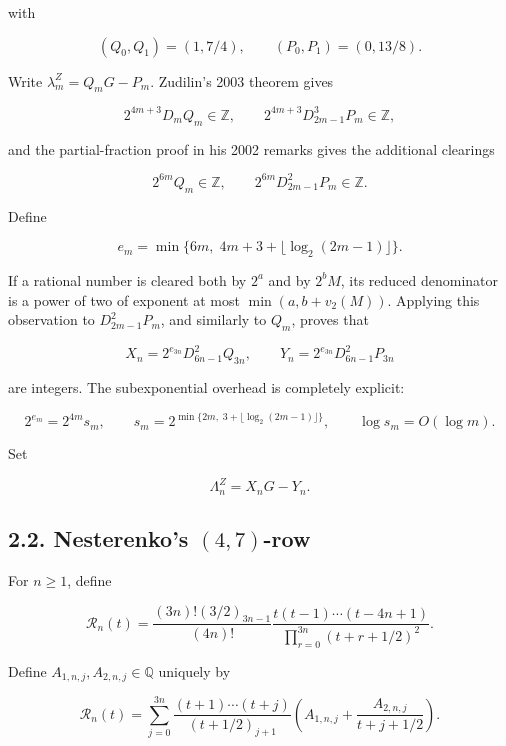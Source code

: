 \documentclass[
  11pt,
]{article}
\begin{document}
with

\[
 (Q_0,Q_1)=(1,7/4),\qquad (P_0,P_1)=(0,13/8).
                                                               \tag{2.2}
\]

Write \(\lambda_m^Z=Q_mG-P_m\). Zudilin's 2003 theorem gives

\[
 2^{4m+3}D_mQ_m\in\mathbb Z,\qquad
 2^{4m+3}D_{2m-1}^3P_m\in\mathbb Z,                  \tag{2.3}
\]

and the partial-fraction proof in his 2002 remarks gives the additional
clearings

\[
 2^{6m}Q_m\in\mathbb Z,\qquad
 2^{6m}D_{2m-1}^2P_m\in\mathbb Z.                   \tag{2.4}
\]

Define

\[
 e_m=\min\{6m,\;4m+3+\lfloor\log_2(2m-1)\rfloor\}.   \tag{2.5}
\]

If a rational number is cleared both by \(2^a\) and by \(2^bM\), its
reduced denominator is a power of two of exponent at most
\(\min(a,b+v_2(M))\). Applying this observation to \(D_{2m-1}^2P_m\),
and similarly to \(Q_m\), proves that

\[
 X_n=2^{e_{3n}}D_{6n-1}^2Q_{3n},\qquad
 Y_n=2^{e_{3n}}D_{6n-1}^2P_{3n}                    \tag{2.6}
\]

are integers. The subexponential overhead is completely explicit:

\[
 2^{e_m}=2^{4m}s_m,\qquad
 s_m=2^{\min\{2m,\;3+\lfloor\log_2(2m-1)\rfloor\}},
 \qquad \log s_m=O(\log m).                          \tag{2.7}
\]

Set

\[
 \Lambda_n^Z=X_nG-Y_n.
                                                               \tag{2.8}
\]

\hypertarget{nesterenkos-47-row}{%
\subsection{\texorpdfstring{2.2. Nesterenko's
\((4,7)\)-row}{2.2. Nesterenko's (4,7)-row}}\label{nesterenkos-47-row}}

For \(n\ge1\), define

\[
 \mathcal R_n(t)=
 \frac{(3n)!(3/2)_{3n-1}}{(4n)!}
 \frac{t(t-1)\cdots(t-4n+1)}
      {\prod_{r=0}^{3n}(t+r+1/2)^2}.                 \tag{2.9}
\]

Define \(A_{1,n,j},A_{2,n,j}\in\mathbb Q\) uniquely by

\[
 \mathcal R_n(t)=\sum_{j=0}^{3n}
 \frac{(t+1)\cdots(t+j)}{(t+1/2)_{j+1}}
 \left(A_{1,n,j}+\frac{A_{2,n,j}}{t+j+1/2}\right).
                                                               \tag{2.10}
\]
\end{document}
